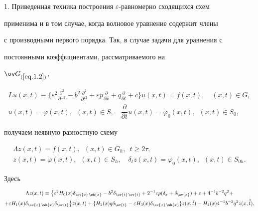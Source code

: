 1. Приведенная техника построения $\varepsilon$-равномерно сходящихся схем


применима и в том случае, когда волновое уравнение содержит члены


с производными первого порядка. Так, в случае задачи для уравнения с


постоянными коэффициентами, рассматриваемого на


$\ov G_{(\ref{eq.1.2})}$,


\begin{equation}


\label{eq.7.1}


\begin{array}{c}


\displaystyle L u(x,t)\equiv \bigg\{\varepsilon^2


\frac{\partial^2}{\partial x^2}-b^2\frac{\partial^2}{\partial t^2}+


\varepsilon p\frac{\partial}{\partial x}+q \frac{\partial}{\partial t}+


c\bigg\}u(x, t)=f(x,t), \quad (x,t)\in G,\\[3mm]


u(x, t)=\varphi(x, t), \ \; (x, t)\in S,


\quad \dfrac{\partial}{\partial t} u(x,


t)=\varphi_0(x, t), \ \; (x, t)\in S_0,


\end{array}


\end{equation}


получаем неявную разностную схему


\begin{gather*}


\Lambda z(x, t)=f(x, t), \ \; (x, t)\in G_h, \ \; t\ge 2\tau,\\


z(x, t)=\varphi(x, t), \ \; (x, t)\in S_h,\quad


\delta_t z(x, t)=\varphi_0(x, t), \ \; (x, t)\in S_{0h}.


\end{gather*}


Здесь


\begin{multline*}


\Lambda z(x,t)\equiv\big\{\varepsilon^2 H_0(x) \delta_{\ov{x}\,\wh{x}}-b^2


\delta_{\ov{t}\,\ov{t}}+2^{-1}


\varepsilon p(\delta_x+\delta_{\ov{x}})+c+4^{-1}b^{-2} q^2+ \\


+\varepsilon H_1(x) \delta_{\ov{x}\,\wh{x}}\delta_{\ov{t}}\big\}z(x,t)+


\{H_2(x) q \delta_{\ov{t}}-\varepsilon H_3(x)


\delta_{\ov{x}\,\wh{x}}\} z(x, \check{t})-H_4(x) 4^{-1} b^{-2} q^2


z(x, \Check{\Check{t}}),


\end{multline*}


